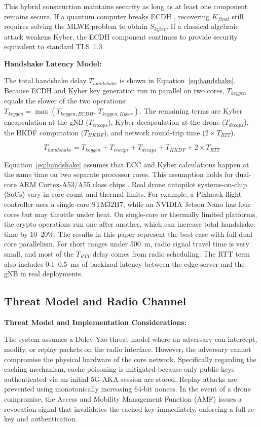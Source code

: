 \documentclass{ieeeaccess}
\begin{document}
This hybrid construction maintains security as long as at least one component remains secure. If a quantum computer breaks ECDH \cite{ref9}, recovering $K_{final}$ still requires solving the MLWE problem to obtain $S_{kyber}$. If a classical algebraic attack weakens Kyber, the ECDH component continues to provide security equivalent to standard TLS~1.3.

\vspace{2mm}\noindent\textbf{Handshake Latency Model:}

The total handshake delay $T_{handshake}$ is shown in Equation~\ref{eq:handshake}. Because ECDH and Kyber key generation run in parallel on two cores, $T_{keygen}$ equals the slower of the two operations: $T_{keygen} = \max(T_{keygen,ECDH},\, T_{keygen,Kyber})$. The remaining terms are Kyber encapsulation at the gNB ($T_{encaps}$), Kyber decapsulation at the drone ($T_{decaps}$), the HKDF computation ($T_{HKDF}$), and network round-trip time ($2 \times T_{RTT}$).

\begin{equation}
T_{handshake} = T_{keygen} + T_{encaps} + T_{decaps} + T_{HKDF} + 2 \times T_{RTT}
\label{eq:handshake}
\end{equation}

Equation~\ref{eq:handshake} assumes that ECC and Kyber calculations happen at the same time on two separate processor cores. This assumption holds for dual-core ARM Cortex-A53/A55 class chips \cite{ref4}. Real drone autopilot systems-on-chip (SoCs) vary in core count and thermal limits. For example, a Pixhawk flight controller uses a single-core STM32H7, while an NVIDIA Jetson Nano has four cores but may throttle under heat. On single-core or thermally limited platforms, the crypto operations run one after another, which can increase total handshake time by 10--20\%. The results in this paper represent the best case with full dual-core parallelism. For short ranges under 500~m, radio signal travel time is very small, and most of the $T_{RTT}$ delay comes from radio scheduling. The RTT term also includes 0.1--0.5~ms of backhaul latency between the edge server and the gNB in real deployments.

\subsection{Threat Model and Radio Channel}
\noindent\textbf{Threat Model and Implementation Considerations:}

The system assumes a Dolev-Yao threat model where an adversary can intercept, modify, or replay packets on the radio interface. However, the adversary cannot compromise the physical hardware of the core network. Specifically regarding the caching mechanism, cache poisoning is mitigated because only public keys authenticated via an initial 5G-AKA session are stored. Replay attacks are prevented using monotonically increasing 64-bit nonces. In the event of a drone compromise, the Access and Mobility Management Function (AMF) issues a revocation signal that invalidates the cached key immediately, enforcing a full re-key and authentication.
\end{document}
